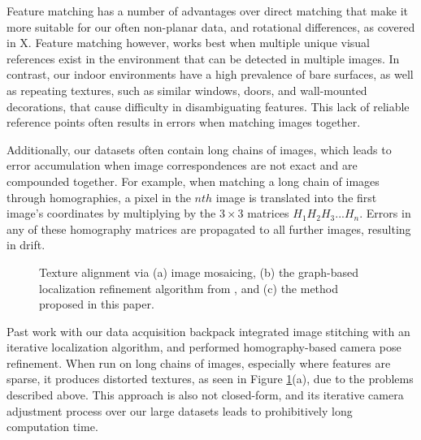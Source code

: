 \documentclass[]{spie}  %
\begin{document}
Feature matching has a number of advantages over direct matching that
make it more suitable for our often non-planar data, and rotational
differences, as covered in X. Feature matching however, works best
when multiple unique visual references exist in the environment that
can be detected in multiple images. In contrast, our indoor
environments have a high prevalence of bare surfaces, as well as
repeating textures, such as similar windows, doors, and wall-mounted
decorations, that cause difficulty in disambiguating features. This
lack of reliable reference points often results in errors when
matching images together.

Additionally, our datasets often contain long chains of images, which
leads to error accumulation when image correspondences are not exact
and are compounded together. For example, when matching a long chain
of images through homographies, a pixel in the $nth$ image is
translated into the first image's coordinates by multiplying by the
$3\times3$ matrices $H_1 H_2 H_3 ... H_n$. Errors in any of these
homography matrices are propagated to all further images, resulting in
drift.

\begin{figure}
  \centering

  \centering

  \centering {}

  \caption{Texture alignment via (a) image mosaicing, (b) the
    graph-based localization refinement algorithm from
    \cite{chen2010indoor}, and (c) the method proposed in this paper.}
  \label{fig:mosaic3D}
\end{figure}


Past work with our data acquisition backpack integrated image
stitching with an iterative localization algorithm, and performed
homography-based camera pose refinement. When run on long chains of
images, especially where features are sparse, it produces distorted
textures, as seen in Figure \ref{fig:mosaic3D}(a), due to the problems
described above. This approach is also not closed-form, and its
iterative camera adjustment process over our large datasets leads to
prohibitively long computation time.
\end{document}

